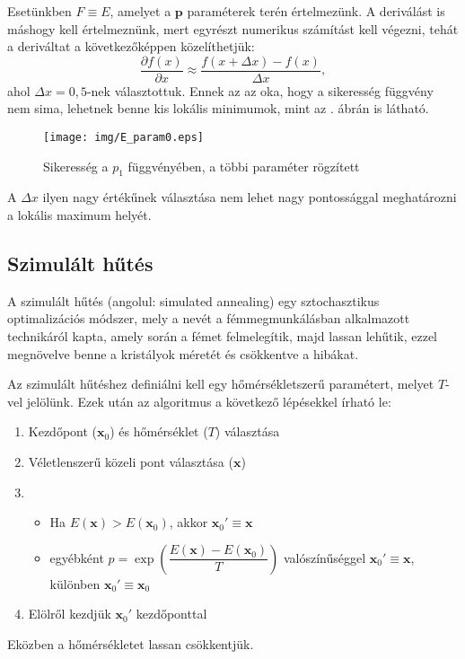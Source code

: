 \documentclass[12pt]{article}
\begin{document}
Esetünkben $F \equiv E$, amelyet a $\mathbf{p}$ paraméterek terén értelmezünk. A deriválást is máshogy kell értelmeznünk, mert egyrészt numerikus számítást kell végezni, tehát a deriváltat a következőképpen közelíthetjük:
\begin{equation}
	\frac{\partial f(x)}{\partial x} \approx \frac{f(x+\Delta x) - f(x)}{\Delta x},
\end{equation}
ahol $\Delta x = 0,5$-nek választottuk. Ennek az az oka, hogy a sikeresség függvény nem sima, lehetnek benne kis lokális minimumok, mint az . ábrán is látható. 
\begin{figure}[H]
	\centering
	\texttt{[image: img/E\_param0.eps]}
	\caption{Sikeresség a $p_1$ függvényében, a többi paraméter rögzített}
	\label{E_param1}
\end{figure}
A $\Delta x$ ilyen nagy értékűnek választása nem lehet nagy pontossággal meghatározni a lokális maximum helyét.
\subsection{Szimulált hűtés}
A szimulált hűtés (angolul: simulated annealing) \cite{simulated_annealing} egy sztochasztikus optimalizációs módszer, mely a nevét a fémmegmunkálásban alkalmazott technikáról kapta, amely során a fémet felmelegítik, majd lassan lehűtik, ezzel megnövelve benne a kristályok méretét és csökkentve a hibákat.

Az szimulált hűtéshez definiálni kell egy hőmérsékletszerű paramétert, melyet $T$-vel jelölünk. Ezek után az algoritmus a következő lépésekkel írható le:
\begin{enumerate} %
	\item Kezdőpont ($\mathbf{x}_0$) és hőmérséklet ($T$) választása
	\item Véletlenszerű közeli pont választása ($\mathbf{x}$)
	\item \begin{itemize}
		\item Ha $E(\mathbf{x}) > E(\mathbf{x}_0) $, akkor $\mathbf{x}_0' \equiv \mathbf{x}$
		\item egyébként $\displaystyle p = \exp\left(\dfrac{E(\mathbf{x}) - E(\mathbf{x}_0)}{T}\right)$ valószínűséggel $\mathbf{x}_0' \equiv \mathbf{x}$, különben $\mathbf{x}_0' \equiv \mathbf{x}_0$
	\end{itemize}
	\item Elölről kezdjük $\mathbf{x}_0'$ kezdőponttal
\end{enumerate} %
Eközben a hőmérsékletet lassan csökkentjük.
\end{document}
